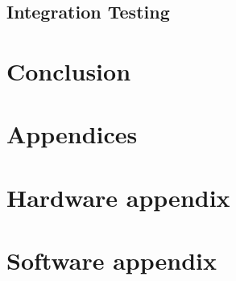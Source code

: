 \section{Integration Testing}
 \newpage
 \newpage

\chapter{Conclusion}

\chapter{Appendices}
\newpage
\listoffigures
{}
\newpage
\listoftables
{}
\newpage
\chapter{Hardware appendix}

\chapter{Software appendix}

\printbibliography
\listoffixmes
